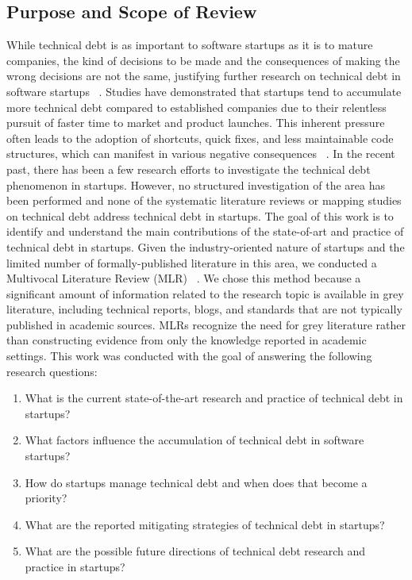 \documentclass[manuscript]{acmart}
\begin{document}
\subsection{Purpose and Scope of Review}
While technical debt is as important to software startups as it is to mature companies, the kind of decisions to be made and the consequences of making the wrong decisions are not the same, justifying further research on technical debt in software startups ~\cite{Unterkalmsteiner16}. Studies have demonstrated that startups tend to accumulate more technical debt compared to established companies due to their relentless pursuit of faster time to market and product launches. This inherent pressure often leads to the adoption of shortcuts, quick fixes, and less maintainable code structures, which can manifest in various negative consequences ~\cite{Giardino2016,Klotins882019}. In the recent past, there has been a few research efforts to investigate the technical debt phenomenon in startups. However, no structured investigation of the area has been performed and none of the systematic literature reviews or mapping studies on technical debt address technical debt in startups. The goal of this work is to identify and understand the main contributions of the state-of-art and practice of technical debt in startups. Given the industry-oriented nature of startups and the limited number of formally-published literature in this area, we conducted a Multivocal Literature Review (MLR) ~\cite{GAROUSI2019101}. We chose this method because a significant amount of information related to the research topic is available in grey literature, including technical reports, blogs, and standards that are not typically published in academic sources. MLRs recognize the need for grey literature rather than constructing evidence from only the knowledge reported in academic settings.
This work was conducted with the goal of answering the following research questions:
\begin{enumerate}
\item What is the current state-of-the-art research and practice of technical debt in startups?
\item {What factors influence the accumulation of technical debt in software startups?}
\item {How do startups manage technical debt and when does that become a priority?}
\item What are the reported mitigating strategies of technical debt in startups?
\item What are the possible future directions of technical debt research and practice in startups?
\end{enumerate}
\end{document}
